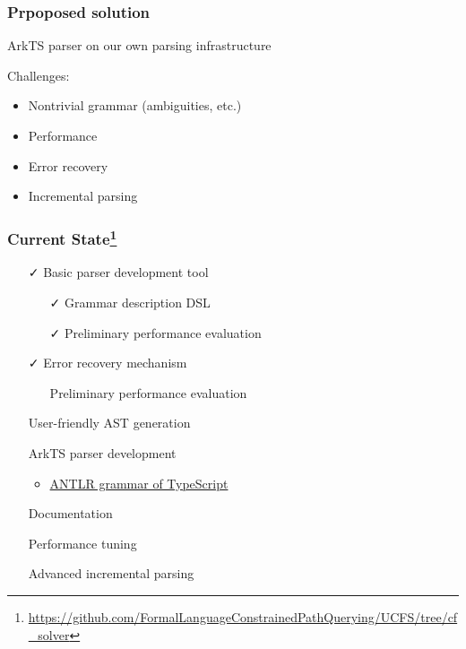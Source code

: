 \documentclass[xcolor=table,aspectratio=169]{beamer}
\begin{document}
\begin{frame}[fragile]
  \frametitle{Prpoposed solution}
  
  ArkTS parser on our own parsing infrastructure

  \vspace{1cm}
  
  Challenges:
  \begin{itemize}
    \item Nontrivial grammar (ambiguities, etc.)    
    \item Performance
    \item Error recovery    
    \item Incremental parsing
  \end{itemize} 
\end{frame}


\begin{frame}[fragile]
  \frametitle{Current State\footnote{\href{https://github.com/FormalLanguageConstrainedPathQuerying/UCFS/tree/cf_solver}{https://github.com/FormalLanguageConstrainedPathQuerying/UCFS/tree/cf\_solver}}}  
  \begin{minipage}{.45\textwidth}
  \begin{itemize}
    \item[\faCheck] Basic parser development tool
    \begin{itemize}
      \item[\faCheck] Grammar description DSL
      \item[\faCheck] Preliminary performance evaluation 
    \end{itemize}
    \item[\faCheck] Error recovery mechanism
    \begin{itemize}
      \item[\faGears] Preliminary performance evaluation 
    \end{itemize}
    \item[\faGears] User-friendly AST generation
  \end{itemize}
\end{minipage}
\begin{minipage}{.45\textwidth}
  \begin{itemize}
    \item[\faHourglassHalf] ArkTS parser development
    \begin{itemize}
      \item \href{https://github.com/antlr/grammars-v4/tree/master/javascript}{ANTLR grammar of TypeScript}
    \end{itemize}
    \item[\faHourglassHalf] Documentation
    \item[\faHourglassHalf] Performance tuning    
    \item[\faHourglassHalf] Advanced incremental parsing
  \end{itemize}
\end{minipage}
\end{frame}
\end{document}
